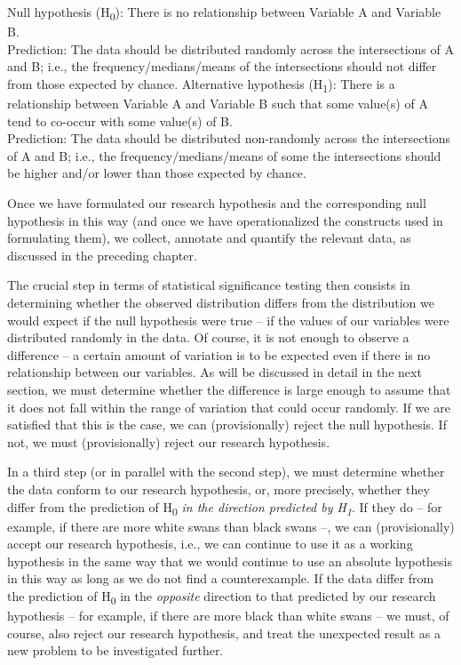 \begin{exe}
\ex
\begin{xlist} 
\label{ex:schematicnullalternative}
\ex Null hypothesis (H\textsubscript{0}): There is no relationship between Variable A and Variable B. \\
Prediction: The data should be distributed randomly across the intersections of A and B; i.e., the frequency/medians/means of the intersections should not differ from those expected by chance.
\ex Alternative hypothesis (H\textsubscript{1}): There is a relationship between Variable A and Variable B such that some value(s) of A tend to co-occur with some value(s) of B. \\
Prediction: The data should be distributed non-randomly across the intersections of A and B; i.e., the frequency/medians/means of some the intersections should be higher and/or lower than those expected by chance.
\end{xlist}
\end{exe}

Once we have formulated our research hypothesis and the corresponding null hypothesis in this way (and once we have operationalized the constructs used in formulating them), we collect, annotate and quantify the relevant data, as discussed in the preceding chapter.

The crucial step in terms of statistical significance testing then consists in determining whether the observed distribution differs from the distribution we would expect if the null hypothesis were true -- if the values of our variables were distributed randomly in the data. Of course, it is not enough to observe a difference -- a certain amount of variation is to be expected even if there is no relationship between our variables. As will be discussed in detail in the next section, we must determine whether the difference is large enough to assume that it does not fall within the range of variation that could occur randomly. If we are satisfied that this is the case, we can (provisionally) reject the null hypothesis. If not, we must (provisionally) reject our research hypothesis.

In a third step (or in parallel with the second step), we must determine whether the data conform to our research hypothesis, or, more precisely, whether they differ from the prediction of H\textsubscript{0} \textit{in the direction predicted by H\textsubscript{1}}. If they do -- for example, if there are more white swans than black swans --, we can (provisionally) accept our research hypothesis, i.e., we can continue to use it as a working hypothesis in the same way that we would continue to use an absolute hypothesis in this way as long as we do not find a counterexample. If the data differ from the prediction of H\textsubscript{0} in the \textit{opposite} direction to that predicted by our research hypothesis -- for example, if there are more black than white swans -- we must, of course, also reject our research hypothesis, and treat the unexpected result as a new problem to be investigated further.

